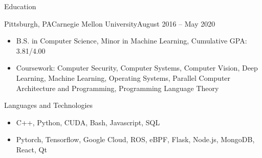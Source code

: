 \documentclass[termes]{resume}
\begin{document}
	\makeheader
	
	\begin{cvsection}{Education}
		\begin{cvsubsection}{Pittsburgh, PA}{Carnegie Mellon University}{August 2016 -- May 2020}
			\begin{itemize}
				\item B.S. in Computer Science, Minor in Machine Learning, Cumulative GPA: 3.81/4.00
				\item Coursework: Computer Security, Computer Systems, Computer Vision, Deep Learning, Machine Learning, Operating Systems, Parallel Computer Architecture and Programming, Programming Language Theory
			\end{itemize}
		\end{cvsubsection}
	\end{cvsection}
		
	\begin{cvsection}{Languages and Technologies}
		\begin{cvsubsection}{}{}{}	
			\begin{itemize}
				\item C++, Python, CUDA, Bash, Javascript, SQL
				\item Pytorch, Tensorflow, Google Cloud, ROS, eBPF, Flask, Node.js, MongoDB, React, Qt
			\end{itemize}
		\end{cvsubsection}
	\end{cvsection}
	
\end{document}
